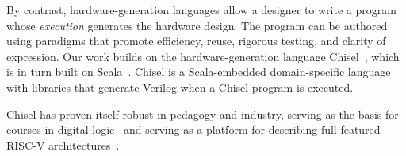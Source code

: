 \documentclass[sigplan,anonymous, review]{acmart}
\begin{document}
By contrast, hardware-generation languages allow a designer to write a program whose \emph{execution} generates the hardware design. The program can be authored using para\-digms that promote efficiency, reuse, rigorous testing, and clarity of expression. Our work builds on the hardware-generation language Chisel~\cite{chisel:book}, which is in turn built on Scala~\cite{scala-overview-tech-report}. Chisel is a Scala-embedded domain-specific language with libraries that generate Verilog when a Chisel program is executed.


Chisel has proven itself robust in pedagogy and industry, serving as the basis for courses in digital logic~\cite{vlsicourse} and serving as a platform for describing full-featured RISC-V architectures~\cite{chisel:riscv}.  
\end{document}
